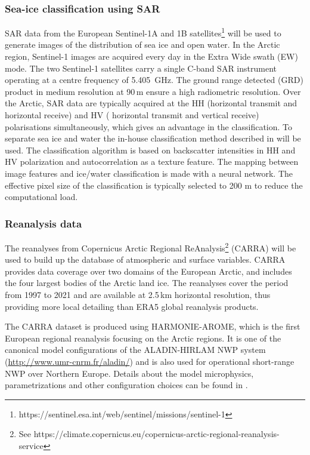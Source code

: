\documentclass[12pt,oneside,a4paper]{article}
\begin{document}
\subsubsection{Sea-ice classification using SAR}
%
\label{sec:sar}
SAR data from the European Sentinel-1A and 1B satellites\footnote{https://sentinel.esa.int/web/sentinel/missions/sentinel-1} will be used to generate images of the distribution of sea ice and open water. In the Arctic region, Sentinel-1 images are acquired every day in the Extra Wide swath (EW) mode. The two Sentinel-1 satellites carry a single C-band SAR instrument operating at a centre frequency of 5.405\, GHz. The ground range detected (GRD) product in medium resolution at 90\,m ensure a high radiometric resolution. Over the Arctic, SAR data are typically acquired at the HH (horizontal transmit and horizontal receive) and HV ( horizontal transmit and vertical receive) polarisations simultaneously, which gives an advantage in the classification.
To separate sea ice and water the in-house classification method described in \citet{aldenhoff:compa:18} will be used. The classification algorithm is based on backscatter intensities in HH and HV polarization and autocorrelation as a texture feature. The mapping between image features and ice/water classification is made with a neural network. The effective pixel size of the classification is typically selected to 200 m to reduce the computational load.

\subsubsection{Reanalysis data}
%
\label{sec:harmonie}
The reanalyses from Copernicus Arctic Regional ReAnalysis\footnote{See https://climate.copernicus.eu/copernicus-arctic-regional-reanalysis-service} (CARRA) will be used to build up the database of atmospheric and surface variables. CARRA provides data coverage over two domains of the European Arctic, and includes the four largest bodies of the Arctic land ice. The reanalyses cover the period from 1997 to 2021 and are available at 2.5\,km horizontal resolution, thus providing more local detailing than ERA5 global reanalysis products. 

The CARRA dataset is produced using HARMONIE-AROME, which is the first European regional reanalysis focusing on the Arctic regions. It is one of
the canonical model configurations of the ALADIN-HIRLAM NWP system
(\url{http://www.umr-cnrm.fr/aladin/}) and is also used for operational
short-range NWP over Northern Europe. Details about the model
microphysics, parametrizations and other configuration choices can be found in
\citet{bengtsson:2017:harmo}. 
\end{document}

